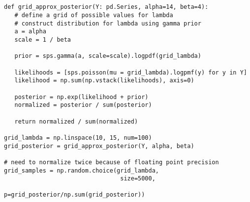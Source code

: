 \subsection{}
\begin{verbatim}
def grid_approx_posterior(Y: pd.Series, alpha=14, beta=4):
   # define a grid of possible values for lambda
   # construct distribution for lambda using gamma prior
   a = alpha
   scale = 1 / beta

   prior = sps.gamma(a, scale=scale).logpdf(grid_lambda)
   
   likelihoods = [sps.poisson(mu = grid_lambda).logpmf(y) for y in Y]
   likelihood = np.sum(np.vstack(likelihoods), axis=0)
   
   posterior = np.exp(likelihood + prior)
   normalized = posterior / sum(posterior)

   return normalized / sum(normalized)

grid_lambda = np.linspace(10, 15, num=100)
grid_posterior = grid_approx_posterior(Y, alpha, beta)

# need to normalize twice because of floating point precision
grid_samples = np.random.choice(grid_lambda, 
                                 size=5000, 
                                 p=grid_posterior/np.sum(grid_posterior))
    
\end{verbatim}